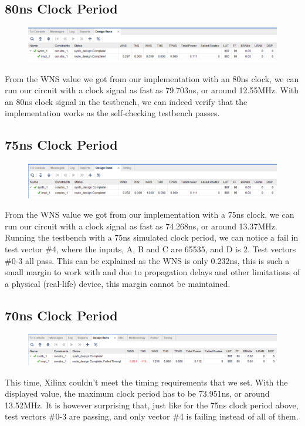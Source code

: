 \documentclass[11pt]{report}
\begin{document}
\subsection*{80ns Clock Period}
\begin{figure}[H]
    \includegraphics[width=\columnwidth]{Reports/Lab2/Waveforms/80ns_design-runs.png}
\end{figure}
From the WNS value we got from our implementation with an 80ns clock, we can run our circuit with a clock signal as fast as 79.703ns, or around 12.55MHz. With an 80ns clock signal in the testbench, we can indeed verify that the implementation works as the self-checking testbench passes.

\subsection*{75ns Clock Period}
\begin{figure}[H]
    \includegraphics[width=\columnwidth]{Reports/Lab2/Waveforms/75ns_design-runs.png}
\end{figure}
From the WNS value we got from our implementation with a 75ns clock, we can run our circuit with a clock signal as fast as 74.268ns, or around 13.37MHz. Running the testbench with a 75ns simulated clock period, we can notice a fail in test vector \#4, where the inputs, A, B and C are 65535, and D is 2. Test vectors \#0-3 all pass. This can be explained as the WNS is only 0.232ns, this is such a small margin to work with and due to propagation delays and other limitations of a physical (real-life) device, this margin cannot be maintained.

\subsection*{70ns Clock Period}
\begin{figure}[H]
    \includegraphics[width=\columnwidth]{Reports/Lab2/Waveforms/70ns_design-runs.png}
\end{figure}
This time, Xilinx couldn't meet the timing requirements that we set. With the displayed value, the maximum clock period has to be 73.951ns, or around 13.52MHz. It is however surprising that, just like for the 75ns clock period above, test vectors \#0-3 are passing, and only vector \#4 is failing instead of all of them.
\end{document}
